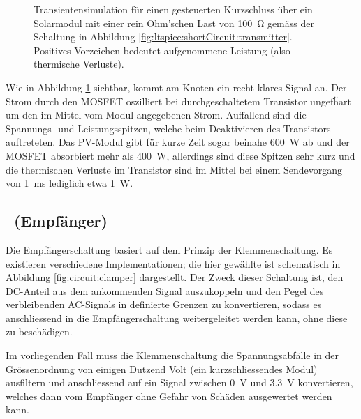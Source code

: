\begin{figure}[h!tb]
    
    \caption{%
        Transientensimulation    f\"ur     einen    gesteuerten    Kurzschluss
        \"uber     ein     Solarmodul     mit     einer     rein     Ohm'schen
        Last      von      \SI{100}{\ohm}     gem\"ass      der      Schaltung
        in   Abbildung   \ref{fig:ltspice:shortCircuit:transmitter}. Positives
        Vorzeichen bedeutet aufgenommene Leistung (also thermische Verluste).%
    }
    \label{fig:simu:shortCircuit:transmitter}
\end{figure}


Wie  in Abbildung  \ref{fig:simu:shortCircuit:transmitter} sichtbar,  kommt am
Knoten  ein  recht klares Signal an. Der Strom  durch den MOSFET
oszilliert bei durchgeschaltetem  Transistor ungef\"hart um den  im Mittel vom
Modul angegebenen Strom. Auffallend sind  die Spannungs- und Leistungsspitzen,
welche beim Deaktivieren des  Transistors auftreteten. Das PV-Modul gibt f\"ur
kurze  Zeit  sogar  beinahe  \SI{600}{\watt}  ab  und  der  MOSFET  absorbiert
mehr  als \SI{400}{\watt},  allerdings sind  diese Spitzen  sehr kurz  und die
thermischen Verluste im  Transistor sind im Mittel bei  einem Sendevorgang von
\SI{1}{\milli\second} lediglich etwa \SI{1}{\watt}.


\clearpage
\subsection{\Master~(Empf\"anger)}
\label{subsec:simu:ask:recv}

Die  Empf\"angerschaltung basiert  auf  dem  Prinzip der  Klemmenschaltung. Es
existieren verschiedene Implementationen; die  hier gew\"ahlte ist schematisch
in Abbildung \ref{fig:circuit:clamper} dargestellt. Der Zweck dieser Schaltung
ist, den DC-Anteil  aus dem ankommenden Signal auszukoppeln und  den Pegel des
verbleibenden  AC-Signals in  definierte  Grenzen zu  konvertieren, sodass  es
anschliessend  in die  Empf\"angerschaltung weitergeleitet  werden kann,  ohne
diese zu besch\"adigen.

Im vorliegenden Fall  muss die Klemmenschaltung die  Spannungsabf\"alle in der
Gr\"ossenordnung  von  einigen  Dutzend  Volt  (ein  kurzschliessendes  Modul)
ausfiltern  und  anschliessend  auf  ein  Signal  zwischen  \SI{0}{\volt}  und
\SI{3.3}{\volt}  konvertieren, welches  dann vom  Empf\"anger ohne  Gefahr von
Sch\"aden ausgewertet werden kann.

